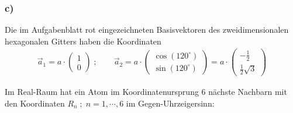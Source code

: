 \subsubsection*{c)}
Die im Aufgabenblatt rot eingezeichneten Basisvektoren des zweidimensionalen
hexagonalen Gitters haben die Koordinaten
\begin{align}
\label{eq-a}
  \vec a_1 = a \cdot \begin{pmatrix} 1 \\ 0 \end{pmatrix} \;; \qquad
  \vec a_2 = a \cdot \begin{pmatrix} \cos(120^\circ)\\ \sin(120^\circ)\end{pmatrix} =
  a \cdot \begin{pmatrix} -\frac{1}{2}\\\frac{1}{2} \sqrt{3}\end{pmatrix}
\end{align}

Im Real-Raum hat ein Atom im Koordinatenursprung 6 nächste Nachbarn
mit den Koordinaten $R_n\;;\;n = 1, \cdots , 6$ im Gegen-Uhrzeigersinn:
